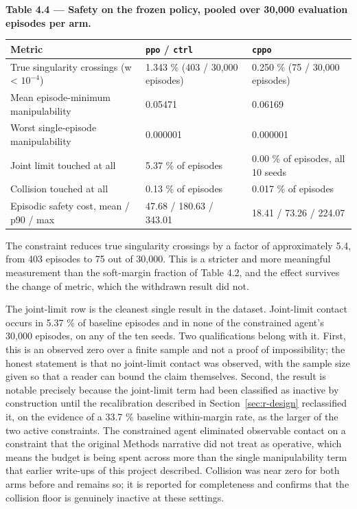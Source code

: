\textbf{Table 4.4 --- Safety on the frozen policy, pooled over 30,000 evaluation episodes per arm.}

\begin{longtable}[]{@{}lll@{}}
\toprule
Metric & \texttt{ppo} / \texttt{ctrl} & \texttt{cppo}\tabularnewline
\midrule
\endhead
True singularity crossings (w \textless{} \(10^{-4}\)) & 1.343 \% (403 / 30,000 episodes) & 0.250 \% (75 / 30,000 episodes)\tabularnewline
Mean episode-minimum manipulability & 0.05471 & 0.06169\tabularnewline
Worst single-episode manipulability & 0.000001 & 0.000001\tabularnewline
Joint limit touched at all & 5.37 \% of episodes & 0.00 \% of episodes, all 10 seeds\tabularnewline
Collision touched at all & 0.13 \% of episodes & 0.017 \% of episodes\tabularnewline
Episodic safety cost, mean / p90 / max & 47.68 / 180.63 / 343.01 & 18.41 / 73.26 / 224.07\tabularnewline
\bottomrule
\end{longtable}

The constraint reduces true singularity crossings by a factor of approximately 5.4, from 403
episodes to 75 out of 30,000. This is a stricter and more meaningful measurement than the
soft-margin fraction of Table 4.2, and the effect survives the change of metric, which the
withdrawn result did not.

The joint-limit row is the cleanest single result in the dataset. Joint-limit contact occurs in
5.37 \% of baseline episodes and in none of the constrained agent's 30,000 episodes, on any of the
ten seeds. Two qualifications belong with it. First, this is an observed zero over a finite sample
and not a proof of impossibility; the honest statement is that no joint-limit contact was observed,
with the sample size given so that a reader can bound the claim themselves. Second, the result is
notable precisely because the joint-limit term had been classified as inactive by construction
until the recalibration described in Section~\ref{sec:r-design} reclassified it, on the evidence of a 33.7 \%
baseline within-margin rate, as the larger of the two active constraints. The constrained agent
eliminated observable contact on a constraint that the original Methods narrative did not treat as
operative, which means the budget is being spent across more than the single manipulability term
that earlier write-ups of this project described. Collision was near zero for both arms before and
remains so; it is reported for completeness and confirms that the collision floor is genuinely
inactive at these settings.

